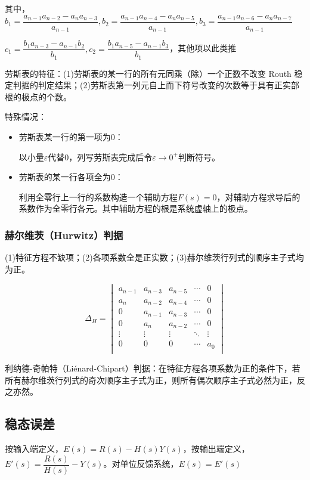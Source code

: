 \documentclass[11pt,a4paper]{ctexart}
\begin{document}
            其中，$b_1=\dfrac{a_{n-1}a_{n-2}-a_na_{n-3}}{a_{n-1}},b_2=\dfrac{a_{n-1}a_{n-4}-a_na_{n-5}}{a_{n-1}},b_3=\dfrac{a_{n-1}a_{n-6}-a_na_{n-7}}{a_{n-1}}$

            $c_1=\dfrac{b_1a_{n-3}-a_{n-1}b_2}{b_1},c_2=\dfrac{b_1a_{n-5}-a_{n-1}b_3}{b_1}$，其他项以此类推
            
            劳斯表的特征：(1)劳斯表的某一行的所有元同乘（除）一个正数不改变 Routh 稳定判据的判定结果；(2)劳斯表第一列元自上而下符号改变的次数等于具有正实部根的极点的个数。

            特殊情况：

            \begin{itemize}
                \item 劳斯表某一行的第一项为$0$：

                以小量$\varepsilon$代替$0$，列写劳斯表完成后令$\varepsilon\rightarrow0^+$判断符号。
                \item 劳斯表的某一行各项全为$0$：

                利用全零行上一行的系数构造一个辅助方程$F(s)=0$，对辅助方程求导后的系数作为全零行各元。其中辅助方程的根是系统虚轴上的极点。
            \end{itemize}
        \subsubsection{赫尔维茨（Hurwitz）判据}
            (1)特征方程不缺项；(2)各项系数全是正实数；(3)赫尔维茨行列式的顺序主子式均为正。
            
            \[
            \Delta_H=\begin{vmatrix}
                a_{n-1} & a_{n-3} & a_{n-5} & \cdots & 0 \\
                a_{n} & a_{n-2} & a_{n-4} & \cdots & 0 \\
                0 & a_{n-1} & a_{n-3} & \cdots & 0 \\
                0 & a_{n} & a_{n-2} & \cdots & 0 \\
                \vdots & \vdots & \vdots & \ddots & \vdots \\
                0 & 0 & 0 & \cdots & a_0 \\
            \end{vmatrix}
            \]

            利纳德-奇帕特（Li\'enard-Chipart）判据：在特征方程各项系数为正的条件下，若所有赫尔维茨行列式的奇次顺序主子式为正，则所有偶次顺序主子式必然为正，反之亦然。
    \subsection{稳态误差}
        按输入端定义，$E(s)=R(s)-H(s)Y(s)$，按输出端定义，$E'(s)=\dfrac{R(s)}{H(s)}-Y(s)$。对单位反馈系统，$E(s)=E'(s)$   
\end{document}
